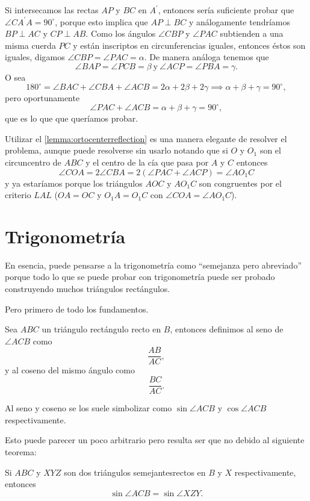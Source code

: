 Si intersecamos las rectas $AP$ y $BC$ en $A^\prime$,
entonces sería suficiente probar que $\angle CA^\prime A = 90^\circ$,
porque esto implica que $AP \perp BC$ y
análogamente tendríamos $BP \perp AC$ y $CP \perp AB$.
Como los ángulos $\angle CBP$ y $\angle PAC$ subtienden
a una misma cuerda $PC$ y están inscriptos
en circunferencias iguales, entonces éstos
son iguales, digamos $\angle CBP = \angle PAC = \alpha$. De manera análoga tenemos que
\[\angle BAP = \angle PCB = \beta \ \text{y} \  \angle ACP = \angle PBA = \gamma.\]
O sea
\[180^\circ = \angle BAC + \angle CBA + \angle ACB = 2\alpha + 2\beta + 2\gamma \implies \alpha + \beta + \gamma = 90^\circ,\]
pero oportunamente
\[\angle PAC + \angle ACB = \alpha + \beta + \gamma = 90^\circ,\]
que es lo que que queríamos probar.


\begin{remark}
	Utilizar el \autoref{lemma:ortocenterreflection} es
	una manera elegante de resolver el problema,
	aunque puede resolverse sin usarlo notando que
	si $O$ y $O_1$ son el circuncentro de $ABC$ y
	el centro de la cía que pasa por $A$ y $C$ entonces
	\[\angle COA = 2\angle CBA = 2(\angle PAC + \angle ACP) = \angle AO_1C\]
	y ya estaríamos porque los triángulos $AOC$ y $AO_1C$
	son congruentes por el criterio $LAL$ ($OA = OC$ y $O_1A = O_1C$ con $\angle COA = \angle AO_1C$).
\end{remark}

\section{Trigonometría}
En esencia, puede pensarse a la trigonometría
como ``semejanza pero abreviado'' porque
todo lo que se puede probar con trigonometría
puede ser probado construyendo muchos triángulos
rectángulos.

Pero primero de todo los fundamentos.
\begin{definition}
	Sea $ABC$ un triángulo rectángulo recto en $B$,
	entonces definimos al seno de $\angle ACB$ como
	\[\frac{AB}{AC},\]
	y al coseno del mismo ángulo como
	\[\frac{BC}{AC}.\]

	Al seno y coseno se los suele
	simbolizar como $\sin \angle ACB$
	y $\cos \angle ACB$ respectivamente.
\end{definition}

Esto puede parecer un poco arbitrario
pero resulta ser que no debido al siguiente
teorema:
\begin{theorem}
	Si $ABC$ y $XYZ$ son dos triángulos semejantes\footnotemark rectos
	en $B$ y $X$ respectivamente, entonces
	\[\sin \angle ACB = \sin \angle XZY.\]
\end{theorem}


